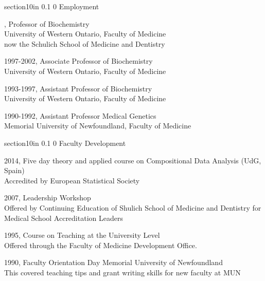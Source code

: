 \documentclass[11pt]{article}
\makeatletter
\renewcommand\section{\@startsection
	{section}{1}{0in}%
	{0.1\baselineskip}%
	{0\baselineskip}%
	{\sffamily\bfseries\large}
}
\makeatother
\begin{document}
\section{Employment}\itemsep=2pt
\begin{description}\itemsep=2pt
\item[2002-present], Professor of Biochemistry\\ University of Western Ontario, Faculty of Medicine\\ now the Schulich School of Medicine and Dentistry
\item 1997-2002, Associate Professor of Biochemistry\\ University of Western Ontario, Faculty of Medicine
\item 1993-1997,	Assistant Professor of Biochemistry\\ University of Western Ontario, Faculty of Medicine
\item 1990-1992,	Assistant Professor Medical Genetics\\ Memorial University of Newfoundland, Faculty of Medicine
\end{description}
\section{Faculty Development}
\begin{description}
\item 2014, Five day theory and applied course on Compositional Data Analysis (UdG, Spain)\\ Accredited by European Statistical Society

\item 2007, Leadership Workshop\\ Offered by Continuing Education of Shulich School of Medicine and Dentistry for Medical School Accreditation Leaders
\item 1995,  Course on Teaching at the University 	Level\\ Offered through the Faculty of Medicine Development Office.
\item 1990, Faculty Orientation Day Memorial University of Newfoundland\\
		This covered teaching tips and grant writing skills for 	new faculty at MUN

\end{description}
\end{document}
